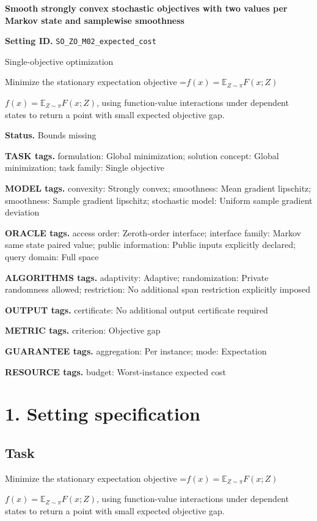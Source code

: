 \documentclass[10pt,a4paper]{article}
\newcommand{\AtlasMath}[1]{\par\begingroup\centering\setbox0=\hbox{$\displaystyle #1$}\ifdim\wd0>1.4\linewidth\typeout{ATLAS WIDE FORMULA: \the\wd0}\fi\ifdim\wd0>\linewidth\resizebox{\linewidth}{!}{\box0}\else\box0\fi\par\endgroup}
\newcommand{\AtlasInlineMath}[1]{\begingroup\setbox0=\hbox{$#1$}\ifdim\wd0>.4\linewidth\endgroup\AtlasMath{#1}\else\endgroup$#1$\fi}
\begin{document}
\raggedright

{\LARGE\bfseries\sffamily\color{AtlasNavy} Smooth strongly convex stochastic objectives with two values per Markov state and samplewise smoothness\par}\vspace{5pt}
\textbf{Setting ID.} \texttt{SO\_\allowbreak{}ZO\_\allowbreak{}M02\_\allowbreak{}expected\_\allowbreak{}cost}

Single-objective optimization

Minimize the stationary expectation objective \AtlasInlineMath{f(x)=\mathbb{E}_{Z\sim\pi}F(x;Z)}, using function-value interactions under dependent states to return a point with small expected objective gap.

\textbf{Status.} Bounds missing

\textbf{TASK tags.} formulation: Global minimization; solution concept: Global minimization; task family: Single objective

\textbf{MODEL tags.} convexity: Strongly convex; smoothness: Mean gradient lipschitz; smoothness: Sample gradient lipschitz; stochastic model: Uniform sample gradient deviation

\textbf{ORACLE tags.} access order: Zeroth-order interface; interface family: Markov same state paired value; public information: Public inputs explicitly declared; query domain: Full space

\textbf{ALGORITHMS tags.} adaptivity: Adaptive; randomization: Private randomness allowed; restriction: No additional span restriction explicitly imposed

\textbf{OUTPUT tags.} certificate: No additional output certificate required

\textbf{METRIC tags.} criterion: Objective gap

\textbf{GUARANTEE tags.} aggregation: Per instance; mode: Expectation

\textbf{RESOURCE tags.} budget: Worst-instance expected cost

\section{1. Setting specification}
\subsection{Task}
Minimize the stationary expectation objective \AtlasInlineMath{f(x)=\mathbb{E}_{Z\sim\pi}F(x;Z)}, using function-value interactions under dependent states to return a point with small expected objective gap.
\end{document}
